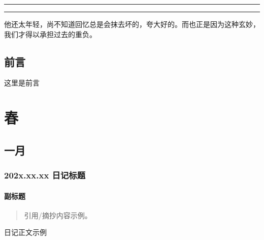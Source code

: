 \documentclass[a4paper,12pt,UTF8,twoside]{ctexbook}%
\title{\songti\zihao{0}{\color{white}拾穗}\vspace{10cm}}%
\author{{\color{white}人生到处知何似，应似飞鸿踏雪泥}\\{\color{white}2021.12.15-}\\{\color{white}\LaTeX}}%
\date{}%
\newcommand\specialsectioning%
{\setcounter{secnumdepth}{-2}}%
\begin{document}
\begin{titlepage}
    \maketitle
\end{titlepage}%
\setcounter{page}{0}
\thispagestyle{empty}
\newpage{}
\hrule
\newpage{}
\thispagestyle{empty}
\hrule
\vspace{8cm}

他还太年轻，尚不知道回忆总是会抹去坏的，夸大好的。而也正是因为这种玄妙，我们才得以承担过去的重负。

\newpage
{}
{\tableofcontents}%
\clearpage
{}
\newpage
\specialsectioning{}

\setcounter{page}{1}
\chapter{前言}
这里是前言


\part{春}
\chapter{一月}
\section{202x.xx.xx 日记标题}
\subsection{副标题}
\begin{quote}
    引用/摘抄内容示例。
\end{quote}

日记正文示例
\end{document}
